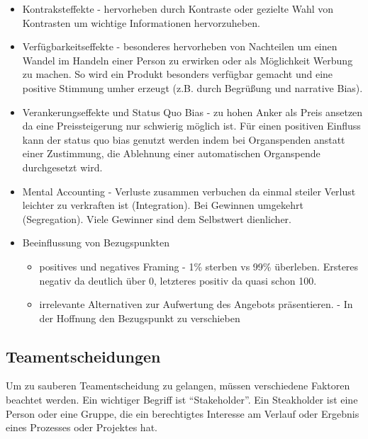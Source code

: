 \begin{itemize}
    \item Kontraksteffekte - hervorheben durch Kontraste oder gezielte Wahl
        von Kontrasten um wichtige Informationen hervorzuheben.
    \item Verfügbarkeitseffekte - besonderes hervorheben von Nachteilen um
        einen Wandel im Handeln einer Person zu erwirken oder als Möglichkeit
        Werbung zu machen. So wird ein Produkt besonders verfügbar gemacht und
        eine positive Stimmung umher erzeugt (z.B. durch Begrüßung und
        narrative Bias).
    \item Verankerungseffekte und Status Quo Bias
        - zu hohen Anker als Preis ansetzen da eine Preissteigerung nur schwierig
        möglich ist. Für einen positiven Einfluss kann der status quo bias
        genutzt werden indem bei Organspenden anstatt einer Zustimmung, die
        Ablehnung einer automatischen Organspende durchgesetzt wird.
    \item Mental Accounting
        - Verluste zusammen verbuchen da einmal steiler Verlust leichter
        zu verkraften ist (Integration). Bei Gewinnen umgekehrt (Segregation).
        Viele Gewinner sind dem Selbstwert dienlicher.
    \item Beeinflussung von Bezugspunkten
    \begin{itemize}
        \item positives und negatives Framing - 1\% sterben vs 99\% überleben.
            Ersteres negativ da deutlich über 0, letzteres positiv da quasi schon 100.
        \item irrelevante Alternativen zur Aufwertung des Angebots präsentieren.
            - In der Hoffnung den Bezugspunkt zu verschieben
    \end{itemize}
\end{itemize}

\subsection{Teamentscheidungen}
Um zu sauberen Teamentscheidung zu gelangen, müssen verschiedene Faktoren beachtet
werden. Ein wichtiger Begriff ist ``Stakeholder''. Ein Steakholder ist eine
Person oder eine Gruppe, die ein berechtigtes Interesse am Verlauf
oder Ergebnis eines Prozesses oder Projektes hat.

